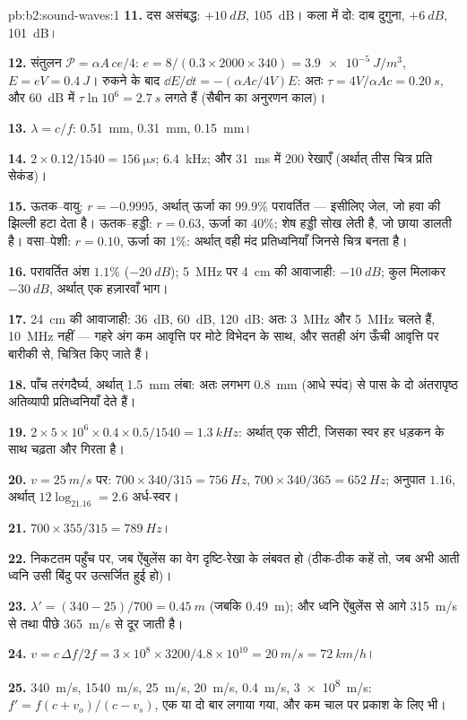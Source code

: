 \begin{solution}{pb:b2:sound-waves:1}
\textbf{11.} दस असंबद्ध: $+\qty{10}{dB}$, \qty{105}{dB}। कला में दो: दाब
दुगुना, $+\qty{6}{dB}$, \qty{101}{dB}।

\textbf{12.} संतुलन $\mathcal P = \alpha A\,ce/4$: $e = 8/(0.3 \times 2000 \times 340) =
\qty{3.9e-5}{J/m^3}$, $E = eV = \qty{0.4}{J}$। रुकने के बाद $\dd E/\dd t = -(\alpha Ac
/4V)E$: अतः $\tau = 4V/\alpha Ac = \qty{0.20}{s}$, और \qty{60}{dB} में $\tau\ln10^6 =
\qty{2.7}{s}$ लगते हैं (सैबीन का अनुरणन काल)।

\textbf{13.} $\lambda = c/f$: \qty{0.51}{mm}, \qty{0.31}{mm}, \qty{0.15}{mm}।

\textbf{14.} $2 \times 0.12/1540 = \qty{156}{\micro s}$; \qty{6.4}{kHz}; और \qty{31}{ms} में
$200$ रेखाएँ (अर्थात् तीस चित्र प्रति सेकंड)।

\textbf{15.} ऊतक--वायु: $r = -0.9995$, अर्थात् ऊर्जा का $99.9\%$ परावर्तित
--- इसीलिए जेल, जो हवा की झिल्ली हटा देता है। ऊतक--हड्डी: $r = 0.63$,
ऊर्जा का $40\%$; शेष हड्डी सोख लेती है, जो छाया
डालती है। वसा--पेशी: $r = 0.10$, ऊर्जा का $1\%$: अर्थात् वही मंद प्रतिध्वनियाँ जिनसे
चित्र बनता है।

\textbf{16.} परावर्तित अंश $1.1\%$ ($-\qty{20}{dB}$); \qty{5}{MHz} पर \qty{4}{cm}
की आवाजाही: $-\qty{10}{dB}$; कुल मिलाकर $-\qty{30}{dB}$, अर्थात् एक हज़ारवाँ भाग।

\textbf{17.} \qty{24}{cm} की आवाजाही: \qty{36}{dB}, \qty{60}{dB}, \qty{120}{dB}: अतः \qty{3}{MHz}
और \qty{5}{MHz} चलते हैं, \qty{10}{MHz} नहीं --- गहरे अंग कम आवृत्ति पर मोटे विभेदन के
साथ, और सतही अंग ऊँची आवृत्ति पर बारीकी से,
चित्रित किए जाते हैं।

\textbf{18.} पाँच तरंगदैर्घ्य, अर्थात् \qty{1.5}{mm} लंबा: अतः लगभग \qty{0.8}{mm}
(आधे स्पंद) से पास के दो अंतरापृष्ठ अतिव्यापी प्रतिध्वनियाँ देते हैं।

\textbf{19.} $2 \times 5 \times 10^6 \times 0.4 \times 0.5/1540 = \qty{1.3}{kHz}$: अर्थात् एक सीटी, जिसका
स्वर हर धड़कन के साथ चढ़ता और गिरता है।

\textbf{20.} $v = \qty{25}{m/s}$ पर: $700 \times 340/315 = \qty{756}{Hz}$, $700 \times 340/365 =
\qty{652}{Hz}$; अनुपात $1.16$, अर्थात् $12\log_21.16 = 2.6$ अर्ध-स्वर।

\textbf{21.} $700 \times 355/315 = \qty{789}{Hz}$।

\textbf{22.} निकटतम पहुँच पर, जब ऐंबुलेंस का वेग दृष्टि-रेखा के
लंबवत हो (ठीक-ठीक कहें तो, जब अभी आती ध्वनि उसी बिंदु पर
उत्सर्जित हुई हो)।

\textbf{23.} $\lambda' = (340 - 25)/700 = \qty{0.45}{m}$ (जबकि \qty{0.49}{m}); और
ध्वनि ऐंबुलेंस से आगे \qty{315}{m/s} से तथा पीछे \qty{365}{m/s} से
दूर जाती है।

\textbf{24.} $v = c\,\Delta f/2f = 3 \times 10^8 \times 3200/4.8 \times 10^{10} = \qty{20}{m/s} =
\qty{72}{km/h}$।

\textbf{25.} \qty{340}{m/s}, \qty{1540}{m/s}, \qty{25}{m/s}, \qty{20}{m/s}, \qty{0.4}{m/s},
\qty{3e8}{m/s}: $f' = f(c + v_o)/(c - v_s)$, एक या दो बार लगाया गया, और कम चाल पर
प्रकाश के लिए भी।
\end{solution}
